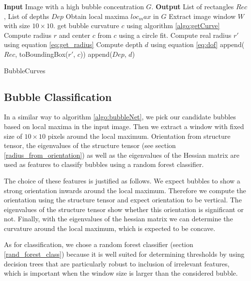 		\begin{algorithm}
			\begin{algorithmic}[1]
				\State \textbf{Input} Image with a high bubble concentration $G$. 
				\State \textbf{Output} List of rectangles $Rec$, List of depths $Dep$
				\State Obtain local maxima $loc_max$ in $G$
					\State Extract image window $W$ with size $10 \times 10$.
						\State get bubble curvature $c$ using algorithm \ref{algo:getCurve}
						\State Compute radius $r$ and center $c$ from $c$ using a circle fit.
						\State Compute real radius $r'$ using equation \ref{eq:get_radius}
						\State Compute depth $d$ using equation \ref{eq:dof}
						\State append($Rec$, toBoundingBox($r'$, $c$))
						\State append($Dep$, $d$)
					\EndIf
				\EndFor
			\end{algorithmic}
			
			\caption{BubbleCurves}
			\label{algo:bubbleCurves}
		\end{algorithm}
	
	
	
	
	
	
	\subsection{Bubble Classification}\label{bubble_classification}
		In a similar way to algorithm \ref{algo:bubbleNet}, we pick our candidate bubbles based on local maxima in the input image. Then we extract a window with fixed size of $10 \times 10$ pixels around the local maximum. Orientation from structure tensor, the eigenvalues of the structure tensor (see section \ref{radius_from_orientation}) as well as the eigenvalues of the Hessian matrix are used as features to classify bubbles using a random forest classifier. 
		
		The choice of these features is justified as follows. We expect bubbles to show a strong orientation inwards around the local maximum. Therefore we compute the orientation using the structure tensor and expect orientation to be vertical. The eigenvalues of the structure tensor show whether this orientation is significant or not. Finally, with the eigenvalues of the hessian matrix we can determine the curvature around the local maximum, which is expected to be concave. 
		
		As for classification, we chose a random forest classifier (section \ref{rand_forest_class}) because it is well suited for determining thresholds by using decision trees that are particularly robust to inclusion of irrelevant features, which is important when the window size is larger than the considered bubble.
		

